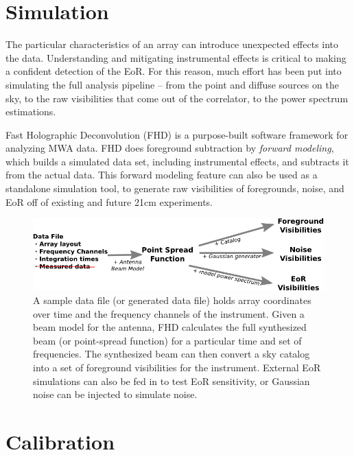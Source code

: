 \documentclass[a0,landscape]{a0poster}
\begin{document}
\begin{multicols}{4}

\section*{Simulation}

The particular characteristics of an array can introduce unexpected effects into the data. Understanding and mitigating instrumental effects is critical to making a confident detection of the EoR. For this reason, much effort has been put into simulating the full analysis pipeline -- from the point and diffuse sources on the sky, to the raw visibilities that come out of the correlator, to the power spectrum estimations.

Fast Holographic Deconvolution (FHD) is a purpose-built software framework for analyzing MWA data. FHD does foreground subtraction by \emph{forward modeling}, which builds a simulated data set, including instrumental effects, and subtracts it from the actual data. This forward modeling feature can also be used as a standalone simulation tool, to generate raw visibilities of foregrounds, noise, and EoR off of existing and future 21cm experiments.

\begin{figure}[H]
\centering
\includegraphics[scale=1]{figures/sim_flowchart.png}
\caption{A sample data file (or generated data file) holds array coordinates over time and the frequency channels of the instrument. Given a beam model for the antenna, FHD calculates the full synthesized beam (or point-spread function) for a particular time and set of frequencies. The synthesized beam can then convert a sky catalog into a set of foreground visibilities for the instrument. External EoR simulations can also be fed in to test EoR sensitivity, or Gaussian noise can be injected to simulate noise.}
\end{figure}


\section*{Calibration}


\end{multicols}
\end{document}
